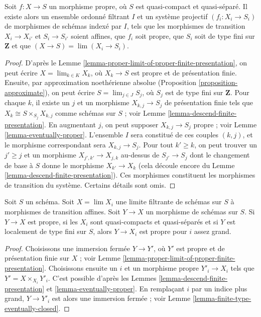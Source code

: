 \begin{lemma}
\label{lemma-proper-limit-of-proper-finite-presentation-noetherian}
Soit $f : X \to S$ un morphisme propre, où $S$ est quasi-compact et
quasi-séparé. Il existe alors un ensemble ordonné filtrant $I$ et un
système projectif $(f_i : X_i \to S_i)$ de morphismes de schémas indexé par $I$,
tels que les morphismes de transition $X_i \to X_{i'}$ et $S_i \to S_{i'}$
soient affines, que $f_i$ soit propre, que $S_i$ soit de type
fini sur $\mathbf{Z}$ et que
$(X \to S) = \lim (X_i \to S_i)$.
\end{lemma}

\begin{proof}
D'après le Lemme \ref{lemma-proper-limit-of-proper-finite-presentation},
on peut écrire $X = \lim_{k \in K} X_k$, où $X_k \to S$ est propre et
de présentation finie. Ensuite, par approximation noethérienne absolue
(Proposition \ref{proposition-approximate}), on peut
écrire $S = \lim_{j \in J} S_j$, où $S_j$ est de type fini sur $\mathbf{Z}$.
Pour chaque $k$, il existe un $j$ et un morphisme $X_{k, j} \to S_j$
de présentation finie tels que $X_k \cong S \times_{S_j} X_{k, j}$
comme schémas sur $S$ ; voir
Lemme \ref{lemma-descend-finite-presentation}.
En augmentant $j$, on peut supposer $X_{k, j} \to S_j$ propre ; voir
Lemme \ref{lemma-eventually-proper}. L'ensemble $I$ sera constitué
de ces couples $(k, j)$, et le morphisme correspondant sera $X_{k, j} \to S_j$.
Pour tout $k' \geq k$, on peut trouver un $j' \geq j$ et un morphisme
$X_{j', k'} \to X_{j, k}$ au-dessus de $S_{j'} \to S_j$ dont le changement de base à $S$
donne le morphisme $X_{k'} \to X_k$ (cela découle encore du
Lemme \ref{lemma-descend-finite-presentation}).
Ces morphismes constituent les morphismes de transition du système. Certains détails
sont omis.
\end{proof}

\begin{lemma}
\label{lemma-finite-type-eventually-proper}
Soit $S$ un schéma. Soit $X = \lim X_i$ une limite filtrante de
schémas sur $S$ à morphismes de transition affines. Soit $Y \to X$
un morphisme de schémas sur $S$.
Si $Y \to X$ est propre, si les $X_i$ sont quasi-compacts et quasi-séparés et si
$Y$ est localement de type fini sur $S$, alors $Y \to X_i$ est propre
pour $i$ assez grand.
\end{lemma}

\begin{proof}
Choisissons une immersion fermée $Y \to Y'$, où $Y'$ est propre et de présentation
finie sur $X$ ; voir
Lemme \ref{lemma-proper-limit-of-proper-finite-presentation}.
Choisissons ensuite un $i$ et un morphisme propre $Y'_i \to X_i$
tels que $Y' = X \times_{X_i} Y'_i$. C'est possible d'après les
Lemmes \ref{lemma-descend-finite-presentation} et
\ref{lemma-eventually-proper}. En remplaçant $i$
par un indice plus grand, $Y \to Y'_i$ est alors une immersion
fermée ; voir Lemme \ref{lemma-finite-type-eventually-closed}.
\end{proof}


